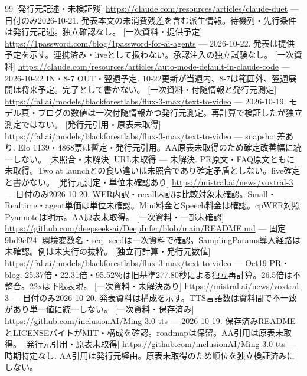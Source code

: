 \documentclass[lualatex,a4paper,10pt]{jlreq}
\begin{document}
{{\begin{thebibliography}{99}
 [発行元記述・未検証残] \url{https://claude.com/resources/articles/claude-duet} --- 日付のみ2026-10-21. 発表本文の未消費残差を含む派生情報。待機列・先行条件は発行元記述。独立確認なし。
 [一次資料・提供予定] \url{https://1password.com/blog/1password-for-ai-agents} --- 2026-10-22. 発表は提供予定を示す。連携済み・liveとして扱わない。承認注入の独立試験なし。
 [一次資料] \url{https://claude.com/resources/articles/auto-mode-default-in-claude-code} --- 2026-10-22 IN・8-7 OUT・翌週予定. 10-22更新が当週内、8-7は範囲外、翌週展開は将来予定。完了として書かない。
 [一次資料・付随情報と発行元測定] \url{https://fal.ai/models/blackforestlabs/flux-3-max/text-to-video} --- 2026-10-19. モデル頁・ブログの数値は一次付随情報かつ発行元測定。再計算で検証したが独立測定ではない。
 [発行元引用・原表未取得] \url{https://fal.ai/models/blackforestlabs/flux-3-max/text-to-video} --- snapshot差あり. Elo 1139・4868票は暫定・発行元引用。AA原表未取得のため確定改善幅に統一しない。
 [未照合・未解決] URL未取得 --- 未解決. PR原文・FAQ原文ともに未取得。Two at launchとの食い違いは未照合であり確定矛盾としない。live確定と書かない。
 [発行元測定・単位未確認あり] \url{https://mistral.ai/news/voxtral-3} --- 日付のみ2026-10-20. WER内訳・recall内訳は比較対象未確認。Small・Realtime・agent単価は単位未確認。Mini料金とSpeech料金は確認。cpWER対照Pyannoteは明示。AA原表未取得。
 [一次資料・一部未確認] \url{https://github.com/deepseek-ai/DeepInfer/blob/main/README.md} --- 固定9bd9cf24. 環境変数名・seq\_seedは一次資料で確認。SamplingParams導入経路は未確認。例は未実行の抜粋。
 [独立再計算・発行元数値] \url{https://fal.ai/models/blackforestlabs/flux-3-max/text-to-video} --- Oct19 PR・blog. 25.37倍・22.31倍・95.52％は旧基準277.80秒による独立再計算。26.5倍は不整合。22xは下限表現。
 [一次資料・未解決あり] \url{https://mistral.ai/news/voxtral-3} --- 日付のみ2026-10-20. 発表資料は構成を示す。TTS言語数は資料間で不一致があり単一値に統一しない。
 [一次資料・保存済み] \url{https://github.com/inclusionAI/Ming-3.0-tts} --- 2026-10-19. 保存済みREADMEとLICENSEバイトがMIT・構成を確認。roadmapは保留。AA引用は原表未取得。
 [発行元引用・原表未取得] \url{https://github.com/inclusionAI/Ming-3.0-tts} --- 時期特定なし. AA引用は発行元経由。原表未取得のため順位を独立検証済みにしない。

\end{thebibliography}}}
\end{document}
